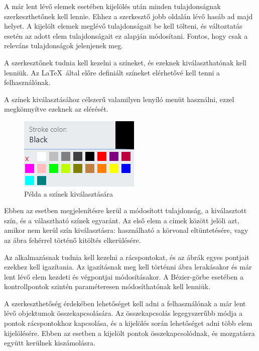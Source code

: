 A már lent lévő elemek esetében kijelölés után minden tulajdonságnak szerkeszthetőnek kell lennie. Ehhez a szerkesztő jobb oldalán lévő hasáb ad majd helyet. A kijelölt elemek meglévő tulajdonságait be kell tölteni, és változtatás esetén az adott elem tulajdonságait ez alapján módosítani. Fontos, hogy csak a releváns tulajdonságok jelenjenek meg.


A szerkesztőnek tudnia kell kezelni a színeket, és ezeknek kiválaszthatónak kell lenniük. Az \LaTeX\ által előre definiált színeket elérhetővé kell tenni a felhasználónak. 

A színek kiválasztásához célszerű valamilyen lenyíló menüt használni, ezzel megkönnyítve ezeknek az elérését. 

\begin{figure}[!h]
	\centering
	\includegraphics[]{images/colorpicker.png}
	\caption{Példa a színek kiválasztására}
	\label{fig:cp}
\end{figure}

Ebben az esetben megjelenítésre kerül a módosított tulajdonság, a kiválasztott szín, és a választható színek egyaránt. Az első elem a címek között jelöli azt, amikor nem kerül szín kiválasztásra: használható a körvonal eltüntetésére, vagy az ábra fehérrel történő kitöltés elkerülésére.


Az alkalmazásnak tudnia kell kezelni a rácspontokat, és az ábrák egyes pontjait ezekhez kell igazítania. Az igazításnak meg kell történni ábra lerakásakor és már lent lévő elem kezdeti és végpontjai módosításakor. A Bézier-görbe esetében a kontrollpontok szintén paraméteresen módosíthatónak kell lenniük.


A szerkeszthetőség érdekében lehetőséget kell adni a felhasználónak a már lent lévő objektumok összekapcsolására. Az összekapcsolás legegyszerűbb módja a pontok rácspontokhoz kapcsolása, és a kijelölés során lehetőséget adni több elem kijelölésére. Ebben az esetben a kijelölt pontok összekapcsolódnak, és mozgatásra együtt kerülnek kiszámolásra.

